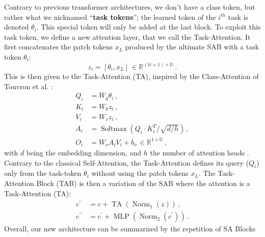 Contrary to previous transformer architectures, we don't have a class token, but rather what we
nicknamed ``\textbf{task tokens}''; the learned token of the $i^{th}$ task is denoted $\theta_i$.
This special token will only be added at the last block. To exploit this task token, we define a new
attention layer, that we call the Task-Attention. It first concatenates the patch tokens $x_L$
produced by the ultimate SAB with a task token $\theta_i$:
%
\begin{equation}
    z_i = [\theta_i, x_L] \, \in \mathbb{R}^{(\mathbb{N} + 1) \times \mathbb{D}}\,.
    \label{eq:dytox_concat_cls_token}
\end{equation}
%
This is then given to the Task-Attention (TA), inspired by the Class-Attention of Touvron et al.
\cite{touvron2021cait}:
%
\begin{equation}
    \begin{aligned}
        Q_i & =W_{q} \theta_i\,,                                                      \\
        K_i & =W_{k} z_i\,,                                                           \\
        V_i & =W_{v} z_i\,,                                                           \\
        A_i & =\operatorname{Softmax}\left(Q_i \cdot K_i^{T} / \sqrt{d / h}\right)\,, \\
        O_i & = W_{o} A_i V_i+b_{o} \, \in \mathbb{R}^{1 \times \mathbb{D}}\,,
    \end{aligned}
    \label{eq:dytox_ca_layer}
\end{equation}
%
with $d$ being the embedding dimension, and $h$ the number of attention heads
\cite{vaswani2017transformer}. Contrary to the classical Self-Attention, the Task-Attention defines
its query ($Q_i$) only from the task-token $\theta_i$ without using the patch tokens $x_L$. The
Task-Attention Block (TAB) is then a variation of the SAB where the attention is a Task-Attention
(TA):
\begin{equation}
    \begin{aligned}
        c^{\prime}       & =c+\operatorname{TA}\left(\operatorname{Norm}_1\left(z\right)\right)\,,                    \\
        c^{\prime\prime} & =c^{\prime}+\operatorname{MLP}\left(\operatorname{Norm}_2\left(c^{\prime}\right)\right)\,.
    \end{aligned}
    \label{eq:dytox_ca_block}
\end{equation}
Overall, our new architecture can be summarized by the repetition of SA Blocks

